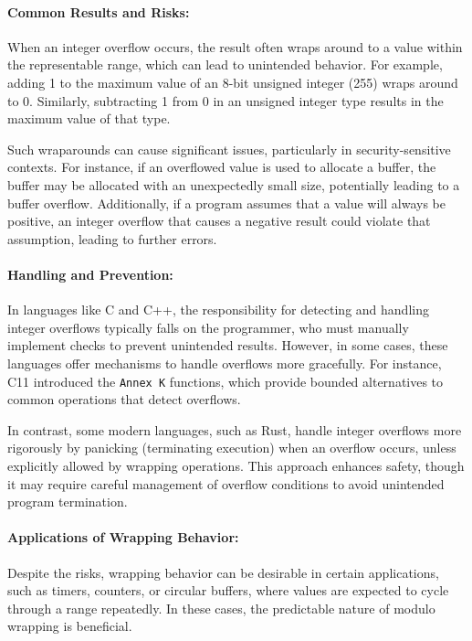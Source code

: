 \documentclass{book}
\begin{document}
\paragraph{Common Results and Risks:}
When an integer overflow occurs, the result often wraps around to a value within the representable range, which can lead to unintended behavior. For example, adding 1 to the maximum value of an 8-bit unsigned integer (255) wraps around to 0. Similarly, subtracting 1 from 0 in an unsigned integer type results in the maximum value of that type.

Such wraparounds can cause significant issues, particularly in security-sensitive contexts. For instance, if an overflowed value is used to allocate a buffer, the buffer may be allocated with an unexpectedly small size, potentially leading to a buffer overflow. Additionally, if a program assumes that a value will always be positive, an integer overflow that causes a negative result could violate that assumption, leading to further errors.

\paragraph{Handling and Prevention:}
In languages like C and C++, the responsibility for detecting and handling integer overflows typically falls on the programmer, who must manually implement checks to prevent unintended results. However, in some cases, these languages offer mechanisms to handle overflows more gracefully. For instance, C11 introduced the \texttt{Annex K} functions, which provide bounded alternatives to common operations that detect overflows.

In contrast, some modern languages, such as Rust, handle integer overflows more rigorously by panicking (terminating execution) when an overflow occurs, unless explicitly allowed by wrapping operations. This approach enhances safety, though it may require careful management of overflow conditions to avoid unintended program termination.

\paragraph{Applications of Wrapping Behavior:}
Despite the risks, wrapping behavior can be desirable in certain applications, such as timers, counters, or circular buffers, where values are expected to cycle through a range repeatedly. In these cases, the predictable nature of modulo wrapping is beneficial.
\end{document}
